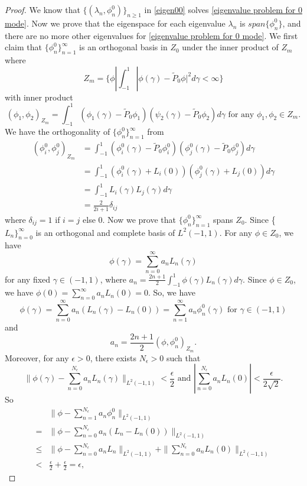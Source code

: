 \documentclass[1 [leqno, 11pt]{amsart}
\numberwithin{equation}{section}
\let\ep=\epsilon
\begin{document}
\begin{CJK*}{GBK}{song}
\begin{proof}
We know that $\{ (\lambda_n, \phi_n^0) \}_{n \geq 1}$ in \eqref{eigen00} solves \eqref{eigenvalue problem for 0 mode}. Now we prove that the eigenspace for each eigenvalue $\lambda_n$ is $span \{\phi_n^0\}$, and there are no more other eigenvalues for \eqref{eigenvalue problem for 0 mode}. We first claim that $\{\phi_n^0\}_{n=1}^\infty$ is an orthogonal basis in $Z_0$ under the inner product of $Z_m$ where
$$Z_m = \{ \phi | \int_{-1}^1 |\phi (\gamma) - \tilde{P}_0 \phi |^2 d \gamma < \infty \}$$
with inner product
$$(\phi_1, \phi_2)_{Z_m} = \int_{-1}^1 (\phi_1 (\gamma) - \tilde{P}_0 \phi_1)(\psi_2 (\gamma) - \tilde{P}_0 \phi_2)  d \gamma \text{ for any } \phi_1, \phi_2 \in Z_m.$$
We have the orthogonality of $\{\phi_n^0\}_{n=1}^\infty$ from
\begin{align*}
(\phi_i^0, \phi_j^0)_{Z_m}
& = \int_{-1}^1 (\phi_i^0 (\gamma) - \tilde{P}_0 \phi_i^0)(\phi_j^0 (\gamma) - \tilde{P}_0 \phi_j^0)d \gamma \\
& = \int_{-1}^1 (\phi_i^0 (\gamma) + L_i(0))(\phi_j^0 (\gamma) + L_j(0))d \gamma \\
& = \int_{-1}^1 L_i(\gamma)L_j(\gamma)d \gamma \\
& = \frac{2}{2i+1}\delta_{ij}
\end{align*}
where $\delta_{ij} = 1$ if $i = j$ else $0$. Now we prove that $\{\phi_n^0\}_{n=1}^\infty$ spans $Z_0$. Since \{$L_n\}_{n=0}^\infty$ is an orthogonal and complete basis of $L^2(-1,1)$. For any $\phi \in Z_0$, we have
$$\phi(\gamma) = \sum_{n=0}^\infty a_n L_n(\gamma)$$ for any fixed $\gamma \in (-1, 1)$, where $a_n = \frac{2n+1}{2}\int_{-1}^1 \phi(\gamma) L_n(\gamma) d \gamma$. Since $\phi \in Z_0$, we have $\phi(0) = \sum_{n=0}^\infty a_n L_n(0) = 0$. So, we have
$$\phi(\gamma) = \sum_{n=0}^\infty a_n (L_n(\gamma) - L_n(0)) =  \sum_{n=1}^\infty a_n \phi_n^0(\gamma) \text{ for } \gamma \in (-1, 1)$$
and
$$a_n = \frac{2n+1}{2}(\phi, \phi_n^0)_{Z_m}.$$ Moreover, for any $\ep > 0$, there exists $N_\ep > 0$ such that
$$\|\phi(\gamma) - \sum_{n=0}^{N_\ep} a_n L_n(\gamma) \|_{L^2(-1,1)} < \frac \ep 2 \text{ and } |\sum_{n=0}^{N_\ep} a_n L_n(0)| < \frac{\ep}{2\sqrt{2}}.$$
So
\begin{align*}
&\|\phi - \sum_{n=1}^{N_\ep} a_n \phi^0_n \|_{L^2(-1,1)} \\
= & \|\phi - \sum_{n=0}^{N_\ep} a_n (L_n - L_n(0))\|_{L^2(-1,1)} \\
\leq & \|\phi - \sum_{n=0}^{N_\ep} a_n L_n \|_{L^2(-1,1)}  + \|\sum_{n=0}^{N_\ep} a_n L_n(0)\|_{L^2(-1,1)} \\
< & \frac{\ep}{2} + \frac{\ep}{2} = \ep,

\end{align*}
\end{proof}
\end{CJK*}
\end{document}

